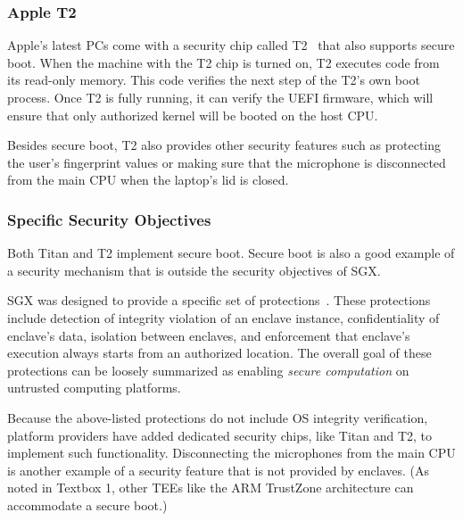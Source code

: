 \documentclass[letterpaper,twocolumn,10pt]{article}
\begin{document}
 
\subsubsection*{Apple T2}
 
Apple's latest PCs come with a security chip called T2~\cite{t2} that also supports secure boot. When the machine with the T2 chip is turned on, T2 executes code from its read-only memory. This code verifies the next step of the T2's own boot process. Once T2 is fully running, it can verify the UEFI firmware, which will ensure that only authorized kernel will be booted on the host CPU.

Besides secure boot, T2 also provides other security features such as protecting the user's fingerprint values or making sure that the microphone is disconnected from the main CPU when the laptop's lid is closed. 
 
 
\subsubsection*{Specific Security Objectives}

  Both Titan and T2 implement secure boot. Secure boot is also a good example of a security mechanism that is outside the security objectives of SGX.

SGX was designed to provide a specific set of protections~\cite{mckeen2013}. These protections include detection of integrity violation of an enclave instance, confidentiality of enclave's data, isolation between enclaves, and enforcement that enclave's execution always starts from an authorized location. The overall  goal of these protections can be loosely summarized as enabling \emph{secure computation} on untrusted computing platforms. 

Because the above-listed protections do not include OS integrity verification, platform providers have added dedicated security chips, like Titan and T2, to implement such functionality. Disconnecting the microphones from the main CPU is another example of a security feature that is not provided by enclaves. (As noted in Textbox 1, other TEEs like the ARM TrustZone architecture can accommodate a secure boot.) 
\end{document}
